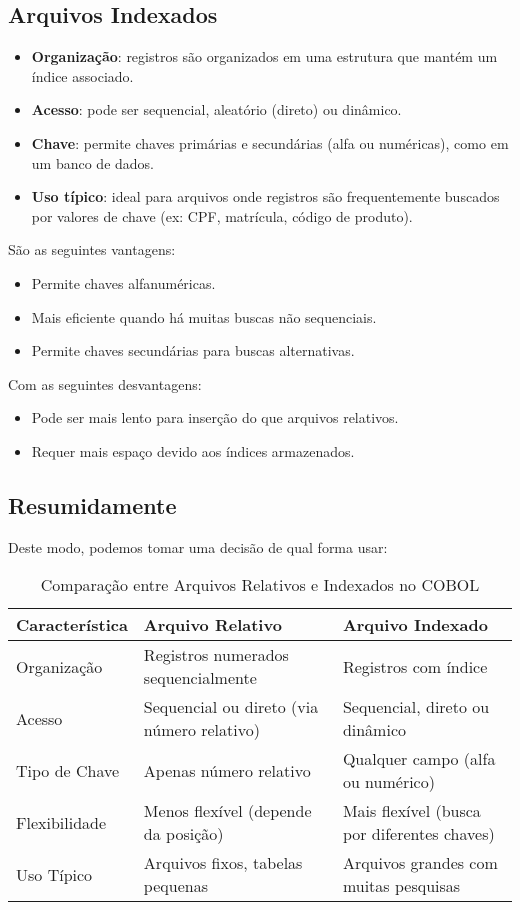 \subsection{Arquivos Indexados}
\begin{itemize}
	\item \textbf{Organização}: registros são organizados em uma estrutura que mantém um índice associado.
	\item \textbf{Acesso}: pode ser sequencial, aleatório (direto) ou dinâmico.
	\item \textbf{Chave}: permite chaves primárias e secundárias (alfa ou numéricas), como em um banco de dados.
	\item \textbf{Uso típico}: ideal para arquivos onde registros são frequentemente buscados por valores de chave (ex: CPF, matrícula, código de produto).
\end{itemize}
São as seguintes vantagens: \vspace{-1em}
\begin{itemize}
	\item Permite chaves alfanuméricas.
	\item Mais eficiente quando há muitas buscas não sequenciais.
	\item Permite chaves secundárias para buscas alternativas.
\end{itemize}
Com as seguintes desvantagens: \vspace{-1em}
\begin{itemize}
	\item Pode ser mais lento para inserção do que arquivos relativos.
	\item Requer mais espaço devido aos índices armazenados.
\end{itemize}

\subsection{Resumidamente}
Deste modo, podemos tomar uma decisão de qual forma usar:
\begin{table}[h]
	\centering
	\renewcommand{\arraystretch}{1.3} %
	\begin{tabular}{|l|l|l|}
		\hline
		\textbf{Característica} & \textbf{Arquivo Relativo} & \textbf{Arquivo Indexado} \\
		\hline
		Organização & Registros numerados sequencialmente & Registros com índice \\
		\hline
		Acesso & Sequencial ou direto (via número relativo) & Sequencial, direto ou dinâmico \\
		\hline
		Tipo de Chave & Apenas número relativo & Qualquer campo (alfa ou numérico) \\
		\hline
		Flexibilidade & Menos flexível (depende da posição) & Mais flexível (busca por diferentes chaves) \\
		\hline
		Uso Típico & Arquivos fixos, tabelas pequenas & Arquivos grandes com muitas pesquisas \\
		\hline
	\end{tabular}
	\caption{Comparação entre Arquivos Relativos e Indexados no COBOL}
	\label{tab:comparacao-arquivos}
\end{table}
